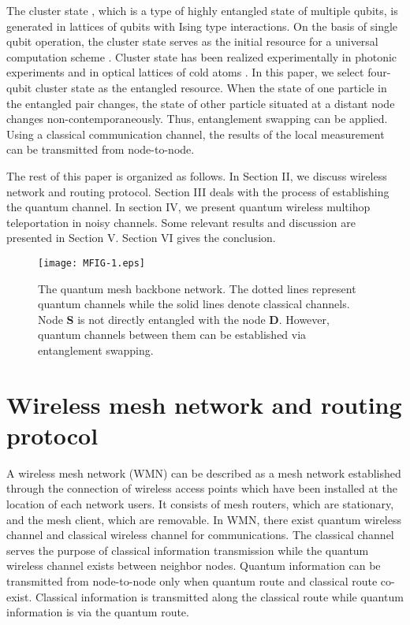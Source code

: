 \documentclass[aps,pra,twocolumn,showpacs,superscriptaddress,groupedaddress]{revtex4}
\begin{document}
The cluster state \cite{MA6}, which is a type of highly entangled state of multiple qubits, is generated in lattices of qubits with Ising type interactions. On the basis of single qubit operation, the cluster state serves as the initial resource for a universal computation scheme \cite{MA7}. Cluster state has been realized experimentally in photonic experiments \cite{MA7} and in optical lattices of cold atoms \cite{MA8}. In this paper, we select four-qubit cluster state as the entangled resource. When the state of one particle in the entangled pair changes, the state of other particle situated at a distant node changes non-contemporaneously. Thus, entanglement swapping can be applied. Using a classical communication channel, the results of the local measurement can be transmitted from node-to-node.

The rest of this paper is organized as follows. In Section II, we discuss wireless network and routing protocol. Section III deals with the process of establishing the quantum channel. In section IV, we present quantum wireless multihop teleportation in noisy channels. Some relevant results and discussion are presented in Section V. Section VI gives the conclusion.
\begin{figure*}[!ht]
\centering \texttt{[image: MFIG-1.eps]}
\caption{\protect\small The quantum mesh backbone network. The dotted lines represent quantum channels while the solid lines denote classical channels. Node {\bf S} is not directly entangled with the node {\bf D}. However, quantum channels between them can be established via entanglement swapping.}
\label{Mfig1}
\end{figure*}

\section{Wireless mesh network and routing protocol}
A wireless mesh network (WMN) can be described as a mesh network established through the connection of wireless access points which have been installed at the location of each network users. It consists of mesh routers, which are stationary, and the mesh client, which are removable. In WMN, there exist quantum wireless channel and classical wireless channel for communications. The classical channel serves the purpose of classical information transmission while the quantum wireless channel exists between neighbor nodes. Quantum information can be transmitted from node-to-node only when quantum route and classical route co-exist. Classical information is transmitted along the classical route while quantum information is via the quantum route. 
\end{document}
